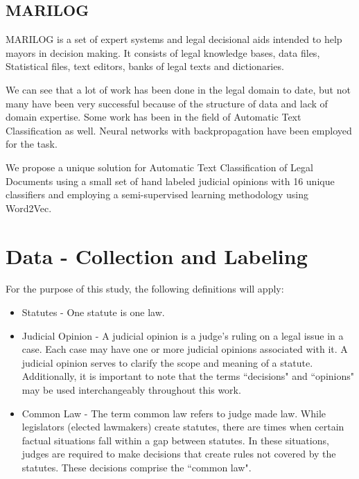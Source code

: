 \documentclass[11pt]{article}
\begin{document}
\subsection{MARILOG}
MARILOG \cite{merkl1997exploration} is a set of expert systems and legal decisional aids intended to help mayors in decision making. It consists of legal knowledge bases, data files, Statistical files, text editors, banks of legal texts and dictionaries. 

We can see that a lot of work has been done in the legal domain to date, but not many have been very successful because of the structure of data and lack of domain expertise. Some work has been in the field of Automatic Text Classification as well. Neural networks with backpropagation have been employed for the task.

We propose a unique solution for Automatic Text Classification of Legal Documents using a small set of hand labeled judicial opinions with 16 unique classifiers and employing a semi-supervised learning methodology using Word2Vec.

\section{Data - Collection and Labeling}
For the purpose of this study, the following definitions will apply:
\begin{itemize}
\item Statutes - One statute is one law.  
\item Judicial Opinion - A judicial opinion is a judge's ruling on a legal issue in a case.  Each case may have one or more judicial opinions associated with it.  A judicial opinion serves to clarify the scope and meaning of a statute.  Additionally, it is important to note that the terms ``decisions" and ``opinions" may be used interchangeably throughout this work.
\item Common Law - The term common law refers to judge made law.  While legislators (elected lawmakers) create statutes, there are times when certain factual situations fall within a gap between statutes.  In these situations, judges are required to make decisions that create rules not covered by the statutes.  These decisions comprise the ``common law".    
\end{itemize}
\end{document}
